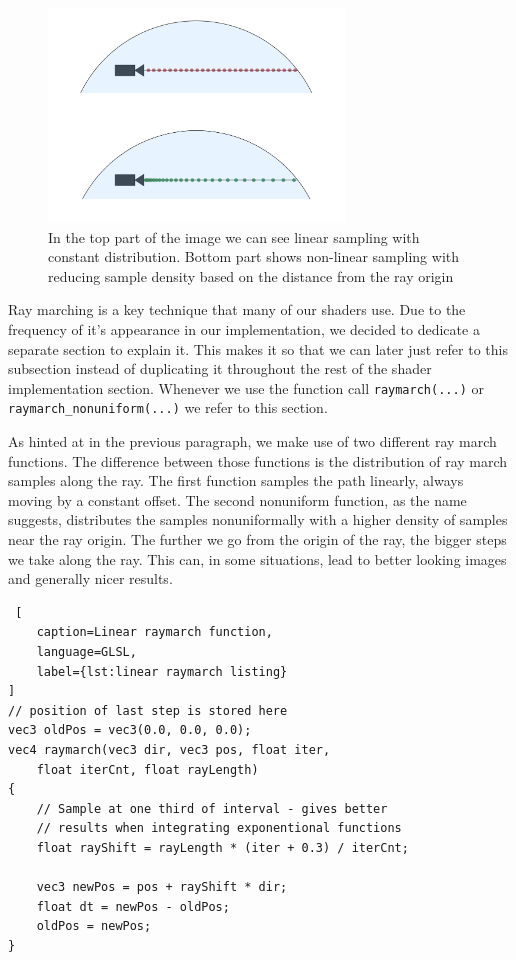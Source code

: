 \documentclass{ctuthesis}
\begin{document}
\begin{figure}
        \includegraphics[width=0.7\textwidth]{media/Linear_vs_nonlinear_sampling.png}
        \caption[linear vs non-linear sampling]{In the top part of the image we can see linear sampling with constant distribution.
            Bottom part shows non-linear sampling with reducing sample density based on the
            distance from the ray origin}
        \label{fig:linear nonlinear samples}
\end{figure}

Ray marching is a key technique that many of our shaders use. Due to the frequency of it's appearance
in our implementation, we decided to dedicate a separate section to explain it. This makes it so that we can later
just refer to this subsection instead of duplicating it throughout the rest of the shader implementation section.
Whenever we use the function call \verb|raymarch(...)| or \verb|raymarch_nonuniform(...)| we refer to this section.

As hinted at in the previous paragraph, we make use of two different ray march functions. The difference
between those functions is the distribution of ray march samples along the ray. The first function
samples the path linearly, always moving by a constant offset. The second nonuniform function, as the name suggests, 
distributes the samples nonuniformally with a higher density of samples near the ray
origin. The further we go from the origin of the ray, the bigger steps we take along the ray. This can,
in some situations, lead to better looking images and generally nicer results.

\begin{lstlisting} [
    caption=Linear raymarch function,
    language=GLSL,
    label={lst:linear raymarch listing}
] 
// position of last step is stored here
vec3 oldPos = vec3(0.0, 0.0, 0.0);
vec4 raymarch(vec3 dir, vec3 pos, float iter, 
    float iterCnt, float rayLength)
{
    // Sample at one third of interval - gives better
    // results when integrating exponentional functions
    float rayShift = rayLength * (iter + 0.3) / iterCnt;

    vec3 newPos = pos + rayShift * dir;
    float dt = newPos - oldPos;
    oldPos = newPos;
}
\end{lstlisting}
\end{document}
